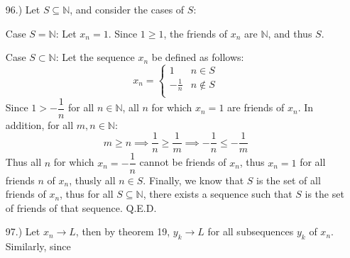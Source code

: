 \documentclass[12pt]{article}
\begin{document}
\begin{itemize}









    \item [96.)] Let $S\subseteq\mathbb{N}$, and consider the cases of $S$:

    Case $S=\mathbb N$: Let $x_n=1$. Since $1\geq 1$, the friends of $x_n$ are $\mathbb{N}$, and thus $S$.

    Case $S\subset\mathbb{N}$: Let the sequence $x_n$ be defined as follows:
    \[x_n=\begin{cases}
        1 & n\in S \\
        -\frac{1}{n} & n\notin S \\
    \end{cases}\]
    Since $1>-\dfrac{1}{n}$ for all $n\in\mathbb{N}$, all $n$ for which $x_n=1$ are friends of $x_n$. In addition, for all $m,n\in\mathbb{N}$:
    \[m\geq n\implies\dfrac{1}{n}\geq\dfrac{1}{m}\implies-\dfrac{1}{n}\leq-\frac{1}{m}\]
    Thus all $n$ for which $x_n=-\dfrac{1}{n}$ cannot be friends of $x_n$, thus $x_n=1$ for all friends $n$ of $x_n$, thusly all $n\in S$. Finally, we know that $S$ is the set of all friends of $x_n$, thus for all $S\subseteq\mathbb{N}$, there exists a sequence such that $S$ is the set of friends of that sequence. Q.E.D.

    \item [97.)] Let $x_n\to L$, then by theorem 19, $y_k\to L$ for all subsequences $y_k$ of $x_n$. Similarly, since


\end{itemize}
\end{document}
